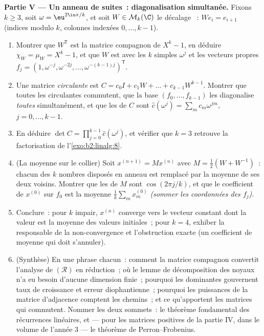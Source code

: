 \begin{problem}
\medskip
\noindent\textbf{Partie V --- Un anneau de suites~: diagonalisation
simultanée.} Fixons $k \geq 3$, soit $\omega = \eu^{2\iu\pi/k}$, et
soit $W \in \mathcal{M}_k(\C)$ le décalage ~: $W e_i =
e_{i+1}$ (indices modulo $k$, colonnes indexées $0, \dots, k-1$).
\begin{enumerate}[resume]
  \item Montrer que $W^{\mathsf T}$ est la matrice compagnon de $X^k -
        1$, en déduire $\chi_W = \mu_W = X^k - 1$, et que $W$ est
         avec les $k$  simples $\omega^j$
        et les vecteurs propres $f_j = (1, \omega^{-j}, \omega^{-2j},
        \dots, \omega^{-(k-1)j})^{\mathsf T}$.
  \item Une matrice \emph{circulante} est $C = c_0 I + c_1 W + \dots +
        c_{k-1}W^{k-1}$. Montrer que toutes les circulantes commutent,
        que la base $(f_0, \dots, f_{k-1})$ les diagonalise \emph{toutes}
        simultanément, et que les  de $C$ sont
        $\widehat c(\omega^j) = \sum_m c_m \omega^{jm}$, $j = 0,
        \dots, k-1$.
  \item En déduire $\det C = \prod_{j=0}^{k-1} \widehat
        c(\omega^j)$, et vérifier que $k = 3$ retrouve la
        factorisation de l'\cref{exo:b2:linalg:8}.
  \item (La moyenne sur le collier) Soit $x^{(n+1)} = Mx^{(n)}$ avec
        $M = \frac12(W + W^{-1})$~: chacun des $k$ nombres disposés en
        anneau est remplacé par la moyenne de ses deux voisins.
        Montrer que les  de $M$ sont $\cos(2\pi j/k)$,
        et que le coefficient de $x^{(0)}$ sur $f_0$ est la moyenne
        $\frac1k\sum_m x^{(0)}_m$ \emph{(sommer les coordonnées des
        $f_j$)}.
  \item Conclure~: pour $k$ impair, $x^{(n)}$ converge vers le vecteur
        constant dont la valeur est la moyenne des valeurs
        initiales~; pour $k = 4$, exhiber la  responsable
        de la non-convergence et l'obstruction exacte (un coefficient
        de moyenne  qui doit s'annuler).
  \item (Synthèse) En une phrase chacun~: comment la matrice compagnon
        convertit l'analyse de $(\mathcal R)$ en réduction~; où le
        lemme de décomposition des noyaux n'a eu besoin d'aucune
        dimension finie~; pourquoi les  dominantes
        gouvernent taux de croissance et erreur diophantienne~;
        pourquoi les puissances de la matrice d'adjacence comptent les
        chemins~; et ce qu'apportent les matrices qui commutent.
        Nommer les deux sommets~: le théorème fondamental des
        récurrences linéaires, et --- pour les matrices positives de
        la partie IV, dans le volume de l'année 3 --- le théorème de
        Perron--Frobenius.
\end{enumerate}
\end{problem}
